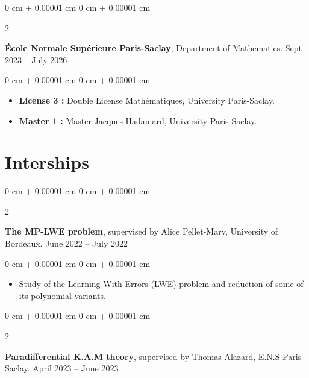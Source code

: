 \documentclass[10pt, letterpaper]{article}
\newenvironment{highlights}{
    \begin{itemize}[
        topsep=0.10 cm,
        parsep=0.10 cm,
        partopsep=0pt,
        itemsep=0pt,
        leftmargin=0 cm + 10pt
    ]
}{
    \end{itemize}
} %
\newenvironment{onecolentry}{
    \begin{adjustwidth}{
        0 cm + 0.00001 cm
    }{
        0 cm + 0.00001 cm
    }
}{
    \end{adjustwidth}
} %
\newenvironment{twocolentry}[2][]{
    \onecolentry
    \def\secondColumn{#2}
    \setcolumnwidth{\fill, 4.5 cm}
    \begin{paracol}{2}
}{
    \switchcolumn \raggedleft \secondColumn
    \end{paracol}
    \endonecolentry
} %
\begin{document}
		
		\vspace{0.2cm}
		
		
        \begin{twocolentry}{
            Sept 2023 – July 2026
        }
            \textbf{École Normale Supérieure Paris-Saclay}, Department of Mathematics. \end{twocolentry}
        \vspace{0.10 cm}
        \begin{onecolentry}
            \begin{highlights}
                \item \textbf{License 3 :} Double License Mathématiques, University Paris-Saclay.
                \item \textbf{Master 1 :} Master Jacques Hadamard, University Paris-Saclay.
            \end{highlights}
        \end{onecolentry}


    
    \section{Interships}



        
        \begin{twocolentry}{
            June 2022 – July 2022
        }
            \textbf{The MP-LWE problem}, supervised by Alice Pellet-Mary, University of Bordeaux. \end{twocolentry}

        \vspace{0.10 cm}
        \begin{onecolentry}
            \begin{highlights}
                \item Study of the Learning With Errors (LWE) problem and reduction of some of its polynomial variants.
            \end{highlights}
        \end{onecolentry}


        \vspace{0.2 cm}

        \begin{twocolentry}{
            April 2023 – June 2023
        }
            \textbf{Paradifferential K.A.M theory}, supervised by Thomas Alazard, E.N.S Paris-Saclay. \end{twocolentry}
\end{document}
